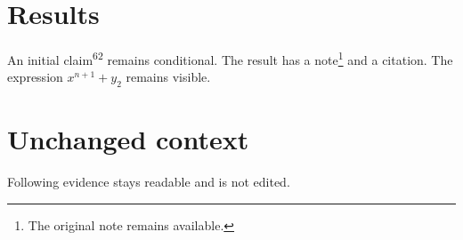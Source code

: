\section{Results}
An initial claim\textsuperscript{62} remains conditional.
The result has a note\footnote{The original note remains available.} and a citation\cite{example}.
The expression $x^{n+1} + y_{2}$ remains visible.
\section{Unchanged context}
Following evidence stays readable and is not edited.
